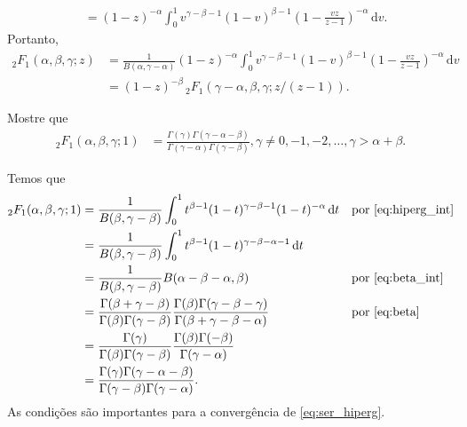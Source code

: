 \documentclass[a4paper,12pt, leqno, answers]{exam}
\begin{document}
\begin{questions}
\begin{parts}
\begin{solution}
\begin{align*}
                &= (1 - z)^{-\alpha} \int_0^1 v^{\gamma - \beta - 1} (1 - v)^{\beta - 1} \left( 1 - \frac{vz}{z - 1} \right)^{-\alpha} \,\mathrm{d}v.
            \end{align*}
            Portanto,
            \begin{align*}
                {}_2F_1(\alpha, \beta, \gamma; z) &= \frac{1}{B(\alpha, \gamma - \alpha)} (1 - z)^{-\alpha} \int_0^1 v^{\gamma - \beta - 1} (1 - v)^{\beta - 1} \left( 1 - \frac{vz}{z - 1} \right)^{-\alpha} \,\mathrm{d}v \\
                &= (1 - z)^{-\beta} \,_2F_1(\gamma - \alpha, \beta, \gamma; z / (z - 1)).
            \end{align*}
        \end{solution}
    \end{parts}

     Mostre que
    \begin{align*}
        _2F_1(\alpha, \beta, \gamma; 1) &= \frac{\Gamma(\gamma)\Gamma(\gamma - \alpha - \beta)}{\Gamma(\gamma - \alpha) \Gamma(\gamma - \beta)}, \gamma \neq 0, -1, -2, \ldots, \gamma > \alpha + \beta.
    \end{align*}
    \begin{solution}
        Temos que
        \begin{align*}
            {}_2F_1(\alpha, \beta, \gamma; 1) &= \frac{1}{B(\beta, \gamma - \beta)} \int_0^1 t^{\beta - 1} (1 - t)^{\gamma - \beta - 1} (1 - t)^{-\alpha} \,\mathrm{d}t && \text{por \eqref{eq:hiperg_int}} \\
            &= \frac{1}{B(\beta, \gamma - \beta)} \int_0^1 t^{\beta - 1} (1 - t)^{\gamma - \beta - \alpha - 1} \,\mathrm{d}t \\
            &= \frac{1}{B(\beta, \gamma - \beta)} B(\alpha - \beta - \alpha, \beta) && \text{por \eqref{eq:beta_int}} \\
            &= \frac{\Gamma(\beta + \gamma - \beta)}{\Gamma(\beta) \Gamma(\gamma - \beta)} \frac{\Gamma(\beta) \Gamma(\gamma - \beta - \gamma)}{\Gamma(\beta + \gamma - \beta - \alpha)} && \text{por \eqref{eq:beta}} \\
            &= \frac{\Gamma(\gamma)}{\Gamma(\beta) \Gamma(\gamma - \beta)} \frac{\Gamma(\beta) \Gamma(- \beta)}{\Gamma(\gamma - \alpha)} \\
            &= \frac{\Gamma(\gamma) \Gamma(\gamma - \alpha - \beta)}{\Gamma(\gamma - \beta) \Gamma(\gamma - \alpha)}.
        \end{align*}
        As condi\c{c}\~{o}es s\~{a}o importantes para a converg\^{e}ncia de \eqref{eq:ser_hiperg}.
    \end{solution}


\end{questions}
\end{document}
